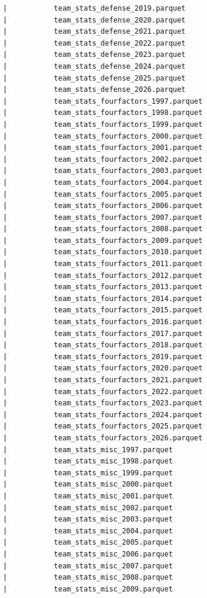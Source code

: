 \begin{lstlisting}
      |           team_stats_defense_2019.parquet
      |           team_stats_defense_2020.parquet
      |           team_stats_defense_2021.parquet
      |           team_stats_defense_2022.parquet
      |           team_stats_defense_2023.parquet
      |           team_stats_defense_2024.parquet
      |           team_stats_defense_2025.parquet
      |           team_stats_defense_2026.parquet
      |           team_stats_fourfactors_1997.parquet
      |           team_stats_fourfactors_1998.parquet
      |           team_stats_fourfactors_1999.parquet
      |           team_stats_fourfactors_2000.parquet
      |           team_stats_fourfactors_2001.parquet
      |           team_stats_fourfactors_2002.parquet
      |           team_stats_fourfactors_2003.parquet
      |           team_stats_fourfactors_2004.parquet
      |           team_stats_fourfactors_2005.parquet
      |           team_stats_fourfactors_2006.parquet
      |           team_stats_fourfactors_2007.parquet
      |           team_stats_fourfactors_2008.parquet
      |           team_stats_fourfactors_2009.parquet
      |           team_stats_fourfactors_2010.parquet
      |           team_stats_fourfactors_2011.parquet
      |           team_stats_fourfactors_2012.parquet
      |           team_stats_fourfactors_2013.parquet
      |           team_stats_fourfactors_2014.parquet
      |           team_stats_fourfactors_2015.parquet
      |           team_stats_fourfactors_2016.parquet
      |           team_stats_fourfactors_2017.parquet
      |           team_stats_fourfactors_2018.parquet
      |           team_stats_fourfactors_2019.parquet
      |           team_stats_fourfactors_2020.parquet
      |           team_stats_fourfactors_2021.parquet
      |           team_stats_fourfactors_2022.parquet
      |           team_stats_fourfactors_2023.parquet
      |           team_stats_fourfactors_2024.parquet
      |           team_stats_fourfactors_2025.parquet
      |           team_stats_fourfactors_2026.parquet
      |           team_stats_misc_1997.parquet
      |           team_stats_misc_1998.parquet
      |           team_stats_misc_1999.parquet
      |           team_stats_misc_2000.parquet
      |           team_stats_misc_2001.parquet
      |           team_stats_misc_2002.parquet
      |           team_stats_misc_2003.parquet
      |           team_stats_misc_2004.parquet
      |           team_stats_misc_2005.parquet
      |           team_stats_misc_2006.parquet
      |           team_stats_misc_2007.parquet
      |           team_stats_misc_2008.parquet
      |           team_stats_misc_2009.parquet

\end{lstlisting}
